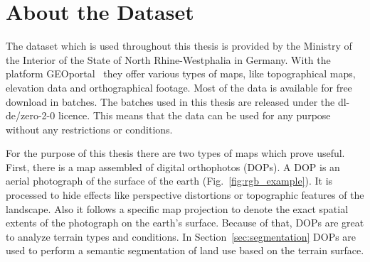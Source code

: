 \section{About the Dataset}
\label{sec:dataset_analysis}
The dataset which is used throughout this thesis is provided by the Ministry of the Interior of the State of North Rhine-Westphalia in Germany. With the platform GEOportal~\cite{geoportal20} they offer various types of maps, like topographical maps, elevation data and orthographical footage. Most of the data is available for free download in batches. The batches used in this thesis are released under the dl-de/zero-2-0 licence. This means that the data can be used for any purpose without any restrictions or conditions.

For the purpose of this thesis there are two types of maps which prove useful. First, there is a map assembled of digital orthophotos (DOPs). A DOP is an aerial photograph of the surface of the earth (Fig.~\ref{fig:rgb_example}). It is processed to hide effects like perspective distortions or topographic features of the landscape. Also it follows a specific map projection to denote the exact spatial extents of the photograph on the earth's surface. Because of that, DOPs are great to analyze terrain types and conditions. In Section~\ref{sec:segmentation} DOPs are used to perform a semantic segmentation of land use based on the terrain surface.

